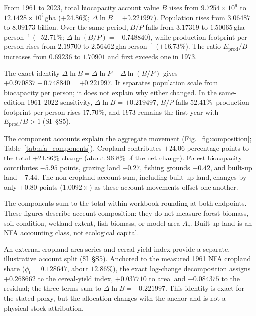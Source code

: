 \documentclass[preprint,12pt,authoryear]{elsarticle}
\begin{document}
From 1961 to 2023, total biocapacity account value $B$ rises from $9.7254\times10^9$ to $12.1428\times10^9$\,gha ($+24.86\%$; $\Delta\ln B=+0.221997$). Population rises from $3.06487$ to $8.09173$ billion. Over the same period, $B/P$ falls from $3.17319$ to $1.50065$\,gha\,person$^{-1}$ ($-52.71\%$; $\Delta\ln(B/P)=-0.748840$), while production footprint per person rises from $2.19700$ to $2.56462$\,gha\,person$^{-1}$ ($+16.73\%$). The ratio $E_{\mathrm{prod}}/B$ increases from $0.69236$ to $1.70901$ and first exceeds one in 1973.

The exact identity $\Delta\ln B=\Delta\ln P+\Delta\ln(B/P)$ gives $+0.970837-0.748840=+0.221997$. It separates population scale from biocapacity per person; it does not explain why either changed. In the same-edition 1961--2022 sensitivity, $\Delta\ln B=+0.219497$, $B/P$ falls $52.41\%$, production footprint per person rises $17.70\%$, and 1973 remains the first year with $E_{\mathrm{prod}}/B>1$ (SI~\S S5).

The component accounts explain the aggregate movement (Fig.~\ref{fig:composition}; Table~\ref{tab:nfa_components}). Cropland contributes $+24.06$ percentage points to the total $+24.86\%$ change (about $96.8\%$ of the net change). Forest biocapacity contributes $-5.95$ points, grazing land $-0.27$, fishing grounds $-0.42$, and built-up land $+7.44$. The non-cropland account sum, including built-up land, changes by only $+0.80$ points ($1.0092\times$) as these account movements offset one another.

The components sum to the total within workbook rounding at both endpoints. These figures describe account composition: they do not measure forest biomass, soil condition, wetland extent, fish biomass, or model area $A_c$. Built-up land is an NFA accounting class, not ecological capital.

\begin{samepage}
An external cropland-area series and cereal-yield index provide a separate, illustrative account split (SI~\S S5). Anchored to the measured 1961 NFA cropland share ($\phi_0=0.128647$, about $12.86\%$), the exact log-change decomposition assigns $+0.268662$ to the cereal-yield index, $+0.037710$ to area, and $-0.084375$ to the residual; the three terms sum to $\Delta\ln B=+0.221997$. This identity is exact for the stated proxy, but the allocation changes with the anchor and is not a physical-stock attribution.\par
\end{samepage}
\end{document}
